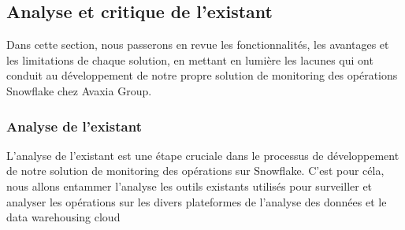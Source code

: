 \subsection{Analyse et critique de l'existant}
Dans cette section, nous passerons en revue les fonctionnalités, les avantages et les limitations de chaque solution, en mettant en lumière les lacunes qui ont conduit au développement de notre propre solution de monitoring des opérations Snowflake chez Avaxia Group.
\subsubsection{Analyse de l'existant}
\par L'analyse de l'existant est une étape cruciale dans le processus de développement de notre solution de monitoring des opérations sur Snowflake.
C'est pour céla, nous allons entammer l'analyse les outils existants utilisés pour surveiller et analyser les opérations sur les divers plateformes de l'analyse des données et le data warehousing cloud
